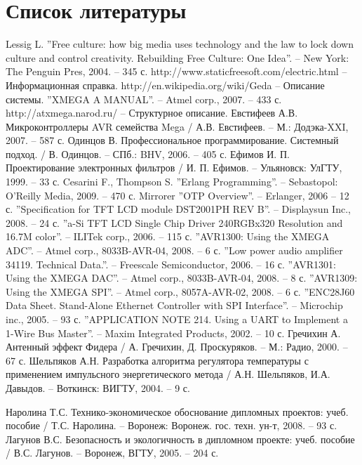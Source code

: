 \documentclass[russian,utf8,14pt,emptystyle,pointsingle,reduceheight=0mm]{eskdtext}
\makeatletter
\renewcommand{\refname}{Список литературы}
\renewenvironment{thebibliography}[1]
    {\section*{\refname}\addcontentsline{toc}{section}{\refname}%
		\asparaenum[1.]
    }{%
        \def\@noitemerr{\@latex@warning{Empty `thebibliography' environment}}%
        \endlist
    }
\makeatother
\begin{document}
\begin{thebibliography}{99}
 Lessig L. ''Free culture: how big media uses technology and the law to
	lock down culture and control creativity. Rebuilding Free Culture: One Idea''. -- New York: The Penguin Pres, 2004. -- 345 с.
 http://www.staticfreesoft.com/electric.html -- Информационная справка.
 http://en.wikipedia.org/wiki/Geda -- Описание системы.
 ''XMEGA A MANUAL''. -- Atmel corp., 2007. -- 433 с.
 http://atxmega.narod.ru/ -- Структурное описание.
 Евстифеев А.В. Микроконтроллеры AVR семейства Mega / А.В. Евстифеев. -- М.: Додэка-XXI, 2007. -- 587 с.
 Одинцов В. Профессиональное программирование. Системный подход. / В. Одинцов. -- СПб.: BHV, 2006. -- 405 с.
 Ефимов И. П. Проектирование электронных фильтров / И. П. Ефимов. -- Ульяновск: УлГТУ, 1999. -- 33 с. 
 Cesarini F., Thompson S. ''Erlang Programming''. -- Sebastopol: O’Reilly Media, 2009. -- 470 с. 
 Mirrorer ''OTP Overview''. -- Erlanger, 2006 -- 12 с.
 ''Specification for TFT LCD module DST2001PH REV B''. -- Displaysun Inc., 2008. -- 24 с.
 ''a-Si TFT LCD Single Chip Driver 240RGBx320 Resolution and 16.7M color''. -- ILITek corp., 2006. -- 115 с.
 ''AVR1300: Using the XMEGA ADC''. -- Atmel corp., 8033B-AVR-04, 2008. -- 6 с.
 ''Low power audio amplifier 34119. Technical Data.''. -- Freescale Semiconductor, 2006. -- 16 с.
 ''AVR1301: Using the XMEGA DAC''. -- Atmel corp., 8033B-AVR-04, 2008. -- 8 с.
 ''AVR1309: Using the XMEGA SPI''. -- Atmel corp., 8057A-AVR-02, 2008. -- 6 с.
 ''ENC28J60 Data Sheet. Stand-Alone Ethernet Controller with SPI Interface''. -- Microchip inc., 2005. -- 93 с.
 ''APPLICATION NOTE 214. Using a UART to Implement a 1-Wire Bus Master''. -- Maxim Integrated Products, 2002. -- 10 с.
 Гречихин А. Антенный эффект Фидера / А. Гречихин, Д. Проскуряков. -- М.: Радио, 2000. -- 67 с.
 Шельпяков А.Н. Разработка алгоритма регулятора температуры с применением
	импульсного энергетического метода / А.Н. Шельпяков, И.А. Давыдов. -- Воткинск: ВИГТУ, 2004. -- 9 с.

 Наролина Т.С. Технико-экономическое обоснование дипломных проектов: учеб. пособие / Т.С. Наролина. -- Воронеж: Воронеж. гос. техн. ун-т, 2008. -- 93 с.
  Лагунов В.С. Безопасность и экологичность в дипломном проекте: учеб. пособие / В.С. Лагунов. -- Воронеж, ВГТУ, 2005. -- 204 с.
\end{thebibliography}


\end{document}
